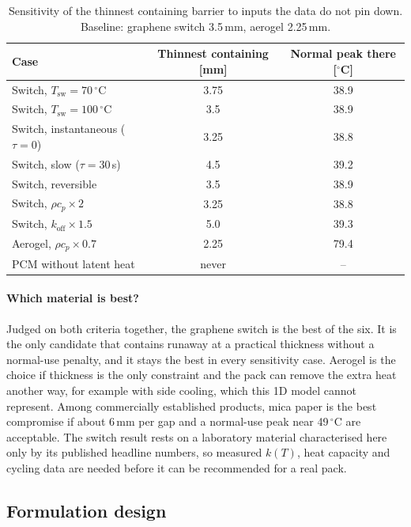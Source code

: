 \documentclass[11pt]{article}
\newcommand{\koff}{k_\mathrm{off}}
\newcommand{\Tsw}{T_\mathrm{sw}}
\begin{document}
\begin{table}[!htbp]
  \centering\small
  \caption{Sensitivity of the thinnest containing barrier to inputs the data do not pin
  down. Baseline: graphene switch 3.5\,mm, aerogel 2.25\,mm.}
  \label{tab:sens}
  \begin{tabular}{@{}lcc@{}}
    \toprule
    Case & Thinnest containing [mm] & Normal peak there [$^\circ$C] \\
    \midrule
    Switch, $\Tsw = 70\,^\circ$C        & 3.75 & 38.9 \\
    Switch, $\Tsw = 100\,^\circ$C       & 3.5  & 38.9 \\
    Switch, instantaneous ($\tau = 0$)  & 3.25 & 38.8 \\
    Switch, slow ($\tau = 30$\,s)       & 4.5  & 39.2 \\
    Switch, reversible                  & 3.5  & 38.9 \\
    Switch, $\rho c_p \times 2$         & 3.25 & 38.8 \\
    Switch, $\koff \times 1.5$          & 5.0  & 39.3 \\
    Aerogel, $\rho c_p \times 0.7$      & 2.25 & 79.4 \\
    PCM without latent heat             & never & -- \\
    \bottomrule
  \end{tabular}
\end{table}

\paragraph{Which material is best?} Judged on both criteria together, the graphene switch is
the best of the six. It is the only candidate that contains runaway at a practical
thickness without a normal-use penalty, and it stays the best in every sensitivity case.
Aerogel is the choice if thickness is the only constraint and the pack can remove the
extra heat another way, for example with side cooling, which this 1D model cannot
represent. Among commercially established products, mica paper is the best compromise if
about 6\,mm per gap and a normal-use peak near 49\,$^\circ$C are acceptable. The switch
result rests on a laboratory material characterised here only by its published headline
numbers, so measured $k(T)$, heat capacity and cycling data are needed before it can be
recommended for a real pack.

\subsection{Formulation design}
\label{sec:formulation}
\end{document}
